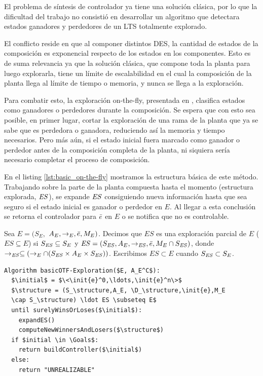 El problema de síntesis de controlador ya tiene una solución clásica, por lo que la dificultad del trabajo no consistió en desarrollar un algoritmo que detectara estados ganadores y perdedores de un LTS totalmente explorado. 

El conflicto reside en que al componer distintos DES, la cantidad de estados de la composición es exponencial respecto de los estados en los componentes. Esto es de suma relevancia ya que la solución clásica, que compone toda la planta para luego explorarla, tiene un límite de escalabilidad en el cual la composición de la planta llega al límite de tiempo o memoria, y nunca se llega a la exploración.

Para combatir esto, la exploración on-the-fly, presentada en \cite{tesisDani}, clasifica estados como ganadores o perdedores durante la composición. Se espera que con esto sea posible, en primer lugar, cortar la exploración de una rama de la planta que ya se sabe que es perdedora o ganadora, reduciendo así la memoria y tiempo necesarios. Pero más aún, si el estado inicial fuera marcado como ganador o perdedor antes de la composición completa de la planta, ni siquiera sería necesario completar el proceso de composición.

En el listing \ref{lst:basic_on-the-fly} mostramos la estructura básica de este método. Trabajando sobre la parte de la planta compuesta hasta el momento (estructura explorada, $\mathit{ES}$), se expande $\mathit{ES}$ consiguiendo nueva información hasta que sea seguro si el estado inicial es ganador o perdedor en $E$. Al llegar a esta conclusión se retorna el controlador para $\bar{e}$ en $E$ o se notifica que no es controlable.

\begin{definition}
	 \label{def:unexploredTo}
	Sea $E = (S_E,$ $A_E, \rightarrow_E, \bar{e}, M_E)$. Decimos que $ES$ es una exploración parcial de $E$ ($ES \subseteq E$) si $S_{\mathit{ES}} \subseteq 
	S_E$ y $\mathit{ES} = (S_{\mathit{ES}},A_E, \rightarrow_{\mathit{ES}},\bar{e},M_E 
	\cap S_{\mathit{ES}})$, donde $ \rightarrow_{\mathit{ES}} \subseteq (\rightarrow_E \cap 
	(S_{\mathit{ES}} \times A_E \times S_{\mathit{ES}}))$. Escribimos $ES \subset E$ cuando $S_{\mathit{ES}} \subset S_E$.
\end{definition}

\begin{lstlisting}[language={pseudocode},label={lst:basic_on-the-fly},caption={Algoritmo on-the-fly básico},float=ht]
Algorithm basicOTF-Exploration($E, A_E^C$):
  $\initial$ = $\<\init{e}^0,\ldots,\init{e}^n\>$
  $\structure = (S_\structure,A_E, \D_\structure,\init{e},M_E 
  \cap S_\structure) \ldot ES \subseteq E$
  until surelyWinsOrLoses($\initial$):
    expandES()
    computeNewWinnersAndLosers($\structure$)
  if $initial \in \Goals$:
    return buildController($\initial$)
  else:
    return "UNREALIZABLE" 
\end{lstlisting}

